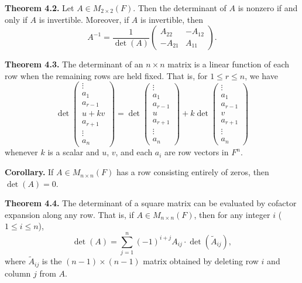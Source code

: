 \documentclass{article}
\newcommand{\0}{\mathit{0}}
\begin{document}
\textbf{Theorem 4.2.} Let $A \in M_{2 \times 2}(F)$. Then the determinant of $A$
is nonzero if and only if $A$ is invertible. Moreover, if $A$ is invertible, then
\[
    A^{-1} = \frac{1}{\det(A)}
    \begin{pmatrix}
        A_{22}  & -A_{12} \\
        -A_{21} & A_{11}
    \end{pmatrix}.
\]

\medskip

\textbf{Theorem 4.3.} The determinant of an $n \times n$ matrix is a linear
function of each row when the remaining rows are held fixed. That is,
for $1 \leq r \leq n$, we have
\[
    \det\begin{pmatrix}
        \vdots  \\
        a_1     \\
        a_{r-1} \\
        u + kv  \\
        a_{r+1} \\
        \vdots  \\
        a_n
    \end{pmatrix} =
    \det\begin{pmatrix}
        \vdots  \\
        a_1     \\
        a_{r-1} \\
        u       \\
        a_{r+1} \\
        \vdots  \\
        a_n
    \end{pmatrix} +
    k \det\begin{pmatrix}
        \vdots  \\
        a_1     \\
        a_{r-1} \\
        v       \\
        a_{r+1} \\
        \vdots  \\
        a_n
    \end{pmatrix}
\]
whenever $k$ is a scalar and $u$, $v$, and each $a_i$ are row vectors in $F^n$.

\medskip

\textbf{Corollary.} If $A \in M_{n \times n}(F)$ has a row consisting entirely of
zeros, then $\det(A) = 0$.

\medskip

\textbf{Theorem 4.4.} The determinant of a square matrix can be evaluated by
cofactor expansion along any row. That is, if $A \in M_{n \times n}(F)$, then
for any integer $i$ ($1 \leq i \leq n$),
\[
    \det(A) = \sum_{j=1}^{n} (-1)^{i+j} A_{ij} \cdot \det(\widetilde{A}_{ij}),
\]
where $\widetilde{A}_{ij}$ is the $(n-1) \times (n-1)$ matrix obtained by deleting
row $i$ and column $j$ from $A$.
\end{document}
